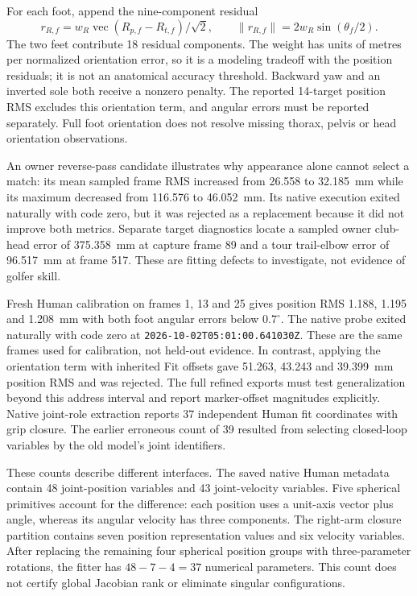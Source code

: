 \documentclass[11pt,a4paper]{article}
\begin{document}
For each foot, append the nine-component residual
\[
 r_{R,f}=w_R\operatorname{vec}(R_{p,f}-R_{t,f})/\sqrt{2},\qquad
 \|r_{R,f}\|=2w_R\sin(\theta_f/2).
\]
The two feet contribute 18 residual components. The weight has units of
metres per normalized orientation error, so it is a modeling tradeoff with
the position residuals; it is not an anatomical accuracy threshold.
Backward yaw and an inverted sole both receive a nonzero penalty.
The reported 14-target position RMS excludes this orientation term, and
angular errors must be reported separately. Full foot orientation does not
resolve missing thorax, pelvis or head orientation observations.

An owner reverse-pass candidate illustrates why appearance alone cannot
select a match: its mean sampled frame RMS increased from 26.558 to
32.185~mm while its maximum decreased from 116.576 to 46.052~mm.
Its native execution exited naturally with code zero, but it was rejected
as a replacement because it did not improve both metrics. Separate
target diagnostics locate a sampled owner club-head error of 375.358~mm
at capture frame 89 and a tour trail-elbow error of 96.517~mm at frame 517.
These are fitting defects to investigate, not evidence of golfer skill.

Fresh Human calibration on frames 1, 13 and 25 gives position RMS
1.188, 1.195 and 1.208~mm with both foot angular errors below $0.7^\circ$.
The native probe exited naturally with code zero at
\texttt{2026-10-02T05:01:00.641030Z}. These are the same frames used for
calibration, not held-out evidence. In contrast, applying the orientation
term with inherited Fit offsets gave 51.263, 43.243 and 39.399~mm position
RMS and was rejected. The full refined exports must test generalization
beyond this address interval and report marker-offset magnitudes explicitly.
Native joint-role extraction reports 37 independent Human fit coordinates
with grip closure. The earlier erroneous count of 39 resulted from selecting
closed-loop variables by the old model's joint identifiers.

These counts describe different interfaces. The saved native Human metadata
contain 48 joint-position variables and 43 joint-velocity variables. Five
spherical primitives account for the difference: each position uses a
unit-axis vector plus angle, whereas its angular velocity has three
components. The right-arm closure partition contains seven position
representation values and six velocity variables. After replacing the
remaining four spherical position groups with three-parameter rotations,
the fitter has $48-7-4=37$ numerical parameters. This count does not certify
global Jacobian rank or eliminate singular configurations.
\end{document}

